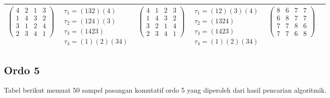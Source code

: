 \begin{longtable}{|c|p{2.7cm}|p{2.7cm}|p{2.7cm}|p{2.7cm}|p{2.7cm}|}
    $\begin{pmatrix} 4 & 2 & 1 & 3 \\ 1 & 4 & 3 & 2 \\ 3 & 1 & 2 & 4 \\ 2 & 3 & 4 & 1 \end{pmatrix}$               &
    $\begin{array}{l}\tau_{1}=(132)(4)\\ \tau_{2}=(124)(3)\\ \tau_{3}=(1423)\\ \tau_{4}=(1)(2)(34)\end{array}$     &
    $\begin{pmatrix} 4 & 1 & 2 & 3 \\ 1 & 4 & 3 & 2 \\ 3 & 2 & 1 & 4 \\ 2 & 3 & 4 & 1 \end{pmatrix}$               &
    $\begin{array}{l}\tau_{1}=(12)(3)(4)\\ \tau_{2}=(1324)\\ \tau_{3}=(1423)\\ \tau_{4}=(1)(2)(34)\end{array}$     &
    $\begin{pmatrix} 8 & 6 & 7 & 7 \\ 6 & 8 & 7 & 7 \\ 7 & 7 & 8 & 6 \\ 7 & 7 & 6 & 8 \end{pmatrix}$                                                                                           \\
    \hline
\end{longtable}
\endgroup

\subsection*{Ordo 5}
Tabel berikut memuat 50 sampel pasangan komutatif ordo 5 yang diperoleh dari hasil pencarian algoritmik.

